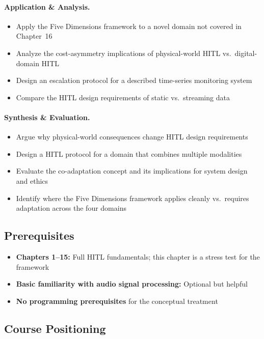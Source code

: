 \paragraph{Application \& Analysis.}
\begin{itemize}
    \item Apply the Five Dimensions framework to a novel domain not covered in Chapter~16
    \item Analyze the cost-asymmetry implications of physical-world HITL vs.\ digital-domain HITL
    \item Design an escalation protocol for a described time-series monitoring system
    \item Compare the HITL design requirements of static vs.\ streaming data
\end{itemize}

\paragraph{Synthesis \& Evaluation.}
\begin{itemize}
    \item Argue why physical-world consequences change HITL design requirements
    \item Design a HITL protocol for a domain that combines multiple modalities
    \item Evaluate the co-adaptation concept and its implications for system design and ethics
    \item Identify where the Five Dimensions framework applies cleanly vs.\ requires adaptation across the four domains
\end{itemize}

\subsection{Prerequisites}
\begin{itemize}
    \item \textbf{Chapters 1--15:} Full HITL fundamentals; this chapter is a stress test for the framework
    \item \textbf{Basic familiarity with audio signal processing:} Optional but helpful
    \item \textbf{No programming prerequisites} for the conceptual treatment
\end{itemize}

\subsection{Course Positioning}

